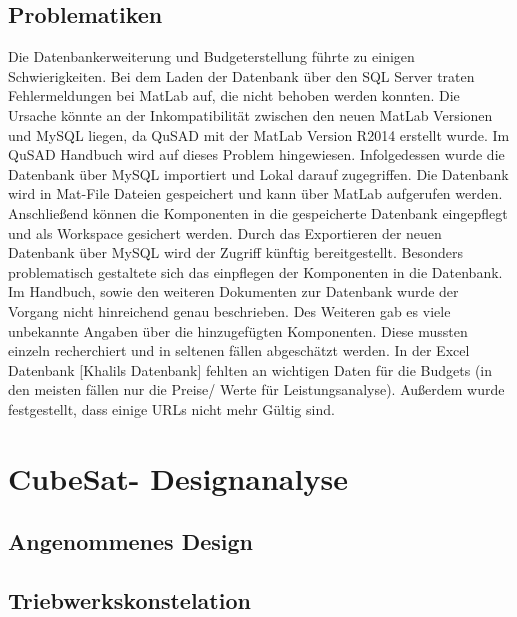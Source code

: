 			\subsection{Problematiken}
			Die Datenbankerweiterung und Budgeterstellung führte zu einigen Schwierigkeiten. Bei dem Laden der Datenbank über den SQL Server traten Fehlermeldungen bei MatLab auf, die nicht behoben werden konnten. Die Ursache könnte an der Inkompatibilität zwischen den neuen MatLab Versionen und MySQL liegen, da QuSAD mit der MatLab Version R2014 erstellt wurde. Im QuSAD Handbuch wird auf dieses Problem hingewiesen. Infolgedessen wurde die Datenbank über MySQL importiert und Lokal darauf zugegriffen. Die Datenbank wird in Mat-File Dateien gespeichert und kann über MatLab aufgerufen werden. Anschließend können die Komponenten in die gespeicherte Datenbank eingepflegt und als Workspace gesichert werden. Durch das Exportieren der neuen Datenbank über MySQL wird der Zugriff künftig bereitgestellt. Besonders problematisch gestaltete sich das einpflegen der Komponenten in die Datenbank. Im Handbuch, sowie den weiteren Dokumenten zur Datenbank wurde der Vorgang nicht hinreichend genau beschrieben. Des Weiteren gab es viele unbekannte Angaben über die hinzugefügten Komponenten. Diese mussten einzeln recherchiert und in seltenen fällen abgeschätzt werden. In der Excel Datenbank [Khalils Datenbank] fehlten an wichtigen Daten für die Budgets (in den meisten fällen nur die Preise/ Werte für Leistungsanalyse). Außerdem wurde festgestellt, dass einige URLs nicht mehr Gültig sind.
		\section{CubeSat- Designanalyse}
				\subsection{Angenommenes Design}
				\subsection{Triebwerkskonstelation}
